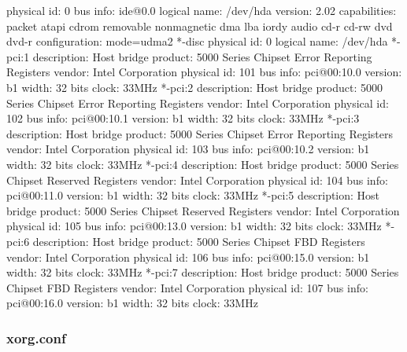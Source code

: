 \documentclass[mingoth,a4paper]{jsarticle}
\begin{document}
{{{{{{{{{\begin{commandline}
                   physical id: 0
                   bus info: ide@0.0
                   logical name: /dev/hda
                   version: 2.02
                   capabilities: packet atapi cdrom removable nonmagnetic dma lba iordy audio cd-r cd-rw dvd dvd-r
                   configuration: mode=udma2
                 *-disc
                      physical id: 0
                      logical name: /dev/hda
     *-pci:1
          description: Host bridge
          product: 5000 Series Chipset Error Reporting Registers
          vendor: Intel Corporation
          physical id: 101
          bus info: pci@00:10.0
          version: b1
          width: 32 bits
          clock: 33MHz
     *-pci:2
          description: Host bridge
          product: 5000 Series Chipset Error Reporting Registers
          vendor: Intel Corporation
          physical id: 102
          bus info: pci@00:10.1
          version: b1
          width: 32 bits
          clock: 33MHz
     *-pci:3
          description: Host bridge
          product: 5000 Series Chipset Error Reporting Registers
          vendor: Intel Corporation
          physical id: 103
          bus info: pci@00:10.2
          version: b1
          width: 32 bits
          clock: 33MHz
     *-pci:4
          description: Host bridge
          product: 5000 Series Chipset Reserved Registers
          vendor: Intel Corporation
          physical id: 104
          bus info: pci@00:11.0
          version: b1
          width: 32 bits
          clock: 33MHz
     *-pci:5
          description: Host bridge
          product: 5000 Series Chipset Reserved Registers
          vendor: Intel Corporation
          physical id: 105
          bus info: pci@00:13.0
          version: b1
          width: 32 bits
          clock: 33MHz
     *-pci:6
          description: Host bridge
          product: 5000 Series Chipset FBD Registers
          vendor: Intel Corporation
          physical id: 106
          bus info: pci@00:15.0
          version: b1
          width: 32 bits
          clock: 33MHz
     *-pci:7
          description: Host bridge
          product: 5000 Series Chipset FBD Registers
          vendor: Intel Corporation
          physical id: 107
          bus info: pci@00:16.0
          version: b1
          width: 32 bits
          clock: 33MHz
\end{commandline}

\subsubsection{xorg.conf}

}}}}}}}}}
\end{document}
